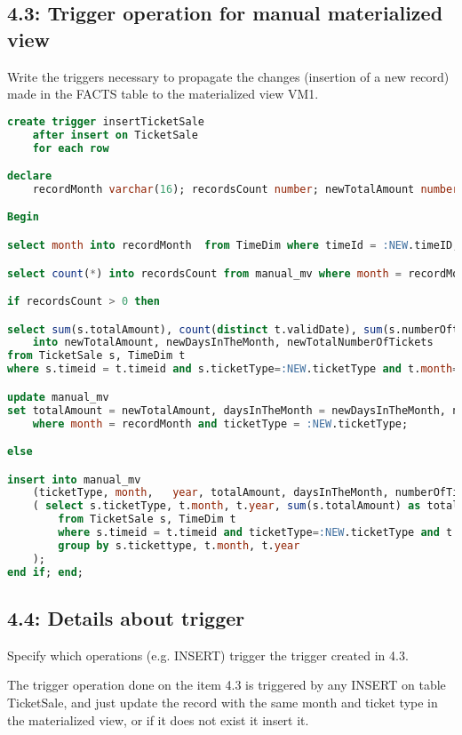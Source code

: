 \subsection{4.3: Trigger operation for manual materialized view}
\begin{question}
    Write the triggers necessary to propagate the changes (insertion of a new record)
made in the FACTS table to the materialized view VM1.
\end{question}
\begin{answer}
    \begin{lstlisting}[language = SQL]
create trigger insertTicketSale
    after insert on TicketSale
    for each row

declare
    recordMonth varchar(16); recordsCount number; newTotalAmount number; newDaysInTheMonth number; newTotalNumberOfTickets number;

Begin

select month into recordMonth  from TimeDim where timeId = :NEW.timeID;

select count(*) into recordsCount from manual_mv where month = recordMonth and ticketType = :NEW.ticketType;

if recordsCount > 0 then

select sum(s.totalAmount), count(distinct t.validDate), sum(s.numberOftickets)
    into newTotalAmount, newDaysInTheMonth, newTotalNumberOfTickets
from TicketSale s, TimeDim t
where s.timeid = t.timeid and s.ticketType=:NEW.ticketType and t.month=recordMonth;

update manual_mv
set totalAmount = newTotalAmount, daysInTheMonth = newDaysInTheMonth, numberOfTickets = newTotalNumberOfTickets
    where month = recordMonth and ticketType = :NEW.ticketType;

else

insert into manual_mv
    (ticketType, month,   year, totalAmount, daysInTheMonth, numberOfTickets)
    ( select s.ticketType, t.month, t.year, sum(s.totalAmount) as totalAmount, count(distinct t.validDate) as daysInTheMonth, sum(s.numberOftickets) as numberOfTickets
        from TicketSale s, TimeDim t
        where s.timeid = t.timeid and ticketType=:NEW.ticketType and t.month=recordMonth
        group by s.tickettype, t.month, t.year
    );
end if; end;
    \end{lstlisting}
\end{answer}
\subsection{4.4: Details about trigger}
\begin{question}
     Specify which operations (e.g. INSERT) trigger the trigger created in 4.3.
\end{question}

\begin{answer}
    The trigger operation done on the item 4.3 is triggered by any INSERT on table TicketSale, and just update the
    record with the same month and ticket type in the materialized view, or if it does not exist it insert it.
\end{answer}

